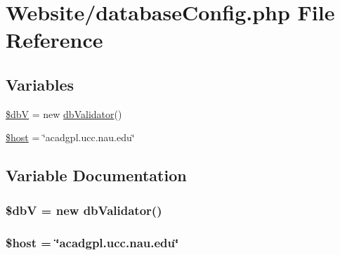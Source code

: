 \hypertarget{database_config_8php}{\section{Website/database\-Config.php File Reference}
\label{database_config_8php}
}
\subsection*{Variables}
\begin{DoxyCompactItemize}
\item 
\hyperlink{database_config_8php_aff4c1dc929e7748b654dc5295a5291c0}{\$db\-V} = new \hyperlink{classdb_validator}{db\-Validator}()
\item 
\hyperlink{database_config_8php_a711797613cb863ca0756df789c396bf2}{\$host} = \char`\"{}acadgpl.\-ucc.\-nau.\-edu\char`\"{}
\end{DoxyCompactItemize}


\subsection{Variable Documentation}
\hypertarget{database_config_8php_aff4c1dc929e7748b654dc5295a5291c0}{
\subsubsection[{\$db\-V}]{\setlength{\rightskip}{0pt plus 5cm}\$db\-V = new {\bf db\-Validator}()}}\label{database_config_8php_aff4c1dc929e7748b654dc5295a5291c0}
\hypertarget{database_config_8php_a711797613cb863ca0756df789c396bf2}{
\subsubsection[{\$host}]{\setlength{\rightskip}{0pt plus 5cm}\$host = \char`\"{}acadgpl.\-ucc.\-nau.\-edu\char`\"{}}}\label{database_config_8php_a711797613cb863ca0756df789c396bf2}
